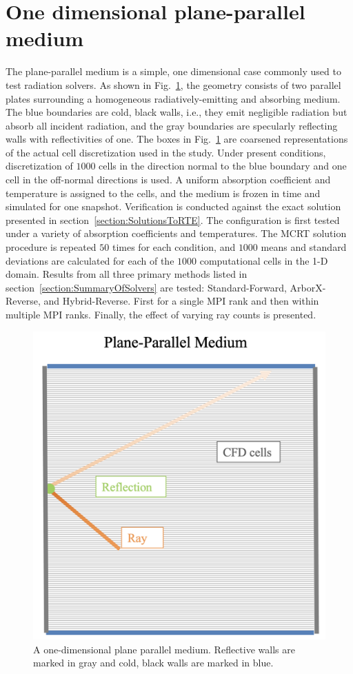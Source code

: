 \section{One dimensional plane-parallel medium}
The plane-parallel medium is a simple, one dimensional case commonly used to test radiation solvers. As shown in Fig.~\ref{fig:PlaneParallel2}, the geometry consists of two parallel plates surrounding a homogeneous radiatively-emitting and absorbing medium. The blue boundaries are cold, black walls, i.e., they emit negligible radiation but absorb all incident radiation, and the gray boundaries are specularly reflecting walls with reflectivities of one. The boxes  in Fig.~\ref{fig:PlaneParallel2} are coarsened representations of the actual cell discretization used in the study. Under present conditions, discretization of $1000$ cells in the direction normal to the blue boundary and one cell in the off-normal directions is used. A uniform absorption coefficient and temperature is assigned to the cells, and the medium is frozen in time and simulated for one snapshot. Verification is conducted against the exact solution presented in section~\ref{section:SolutionsToRTE}. 
The configuration is first tested under a variety of absorption coefficients and temperatures.
The MCRT solution procedure is repeated $50$ times for each condition, and $1000$ means and standard deviations are calculated for each of the $1000$ computational cells in the 1-D domain.
Results from all three primary methods listed in section~\ref{section:SummaryOfSolvers} are tested: Standard-Forward, ArborX-Reverse, and Hybrid-Reverse. First for a single MPI rank and then within multiple MPI ranks. Finally, the effect of varying ray counts is presented.

\begin{figure}
\centering
\includegraphics[width=0.5\linewidth]{figures/ch4/PlaneParallel.png}
\caption{A one-dimensional plane parallel medium. Reflective walls are marked in gray and  cold, black walls are marked in blue.}
\label{fig:PlaneParallel2}
\end{figure}

